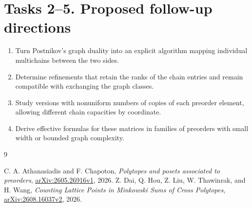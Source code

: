 \documentclass[11pt]{article}
\begin{document}
\section*{Tasks 2--5. Proposed follow-up directions}
\begin{enumerate}[label=\textbf{Task \arabic*.},start=2,leftmargin=*]
\item Turn Postnikov's graph duality into an explicit algorithm
mapping individual multichains between the two sides.
\item Determine refinements that retain the ranks of the chain
entries and remain compatible with exchanging the graph classes.
\item Study versions with nonuniform numbers of copies of each
preorder element, allowing different chain capacities by coordinate.
\item Derive effective formulas for these matrices in families of
preorders with small width or bounded graph complexity.
\end{enumerate}
\begin{thebibliography}{9}
\raggedright
{} C. A. Athanasiadis and F. Chapoton,
\emph{Polytopes and posets associated to preorders},
\href{https://arxiv.org/abs/2605.26916v1}{arXiv:2605.26916v1}, 2026.
 Z. Dai, Q. Hou, Z. Liu, W. Thawinrak, and H. Wang,
\emph{Counting Lattice Points in Minkowski Sums of Cross Polytopes},
\href{https://arxiv.org/abs/2608.16037v2}{arXiv:2608.16037v2}, 2026.
\end{thebibliography}
\end{document}
